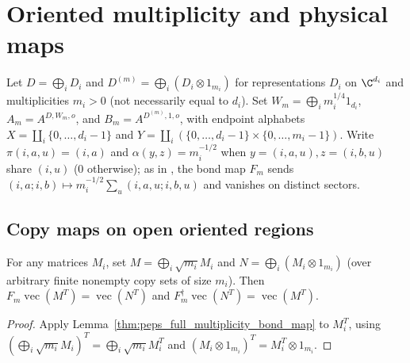 \section{Oriented multiplicity and physical maps}
\label{sec:peps_oriented_copy_parent_transport}

Let $D=\bigoplus_iD_i$ and $D^{(m)}=\bigoplus_i(D_i\otimes1_{m_i})$ for representations $D_i$ on $\C^{d_i}$ and multiplicities $m_i>0$ (not necessarily equal to $d_i$). Set $W_m=\bigoplus_i m_i^{1/4}1_{d_i}$, $A_m=A^{D,W_m,o}$, and $B_m=A^{D^{(m)},1,o}$, with endpoint alphabets $X=\coprod_i\{0,\ldots,d_i-1\}$ and $Y=\coprod_i(\{0,\ldots,d_i-1\}\times\{0,\ldots,m_i-1\})$. Write $\pi(i,a,u)=(i,a)$ and $\alpha(y,z)=m_i^{-1/2}$ when $y=(i,a,u),z=(i,b,u)$ share $(i,u)$ ($0$ otherwise); as in \cite[Section~7]{Schuch2010PEPS}, the bond map $F_m$ sends $(i,a;i,b)\mapsto m_i^{-1/2}\sum_u(i,a,u;i,b,u)$ and vanishes on distinct sectors.

\subsection{Copy maps on open oriented regions}

\begin{lemma}%
    \label{thm:peps_oriented_copy_transpose}
    \leanok
    For any matrices $M_i$, set $M=\bigoplus_i\sqrt{m_i}M_i$ and $N=\bigoplus_i(M_i\otimes1_{m_i})$ (over arbitrary finite nonempty copy sets of size $m_i$). Then $F_m\operatorname{vec}(M^T)=\operatorname{vec}(N^T)$ and $F_m^\dagger\operatorname{vec}(N^T)=\operatorname{vec}(M^T)$.
\end{lemma}
\begin{proof}\leanok
    Apply Lemma~\ref{thm:peps_full_multiplicity_bond_map} to $M_i^T$, using $(\bigoplus_i\sqrt{m_i}M_i)^T=\bigoplus_i\sqrt{m_i}M_i^T$ and $(M_i\otimes1_{m_i})^T=M_i^T\otimes1_{m_i}$.
\end{proof}

